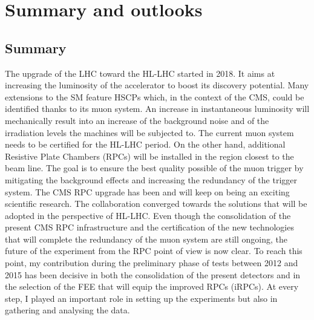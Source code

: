 \renewcommand\evenpagerightmark{{\scshape\small Chapter 7}}
\renewcommand\oddpageleftmark{{\scshape\small Summary and outlooks}}

\hyphenation{}

\chapter[Summary and outlooks]{Summary and outlooks}
\label{chapt7}

	\section{Summary}
	\label{chapt7:sec:summary}
	
	The upgrade of the \acf{LHC} toward the \acf{HL-LHC} started in 2018. It aims at increasing the luminosity of the accelerator to boost its discovery potential. Many extensions to the \acf{SM} feature \acf{HSCPs} which, in the context of the \acf{CMS}, could be identified thanks to its muon system. An increase in instantaneous luminosity will mechanically result into an increase of the background noise and of the irradiation levels the machines will be subjected to. The current muon system needs to be certified for the HL-LHC period. On the other hand, additional Resistive Plate Chambers (RPCs) will be installed in the region closest to the beam line. The goal is to ensure the best quality possible of the muon trigger by mitigating the background effects and increasing the redundancy of the trigger system. The CMS RPC upgrade has been and will keep on being an exciting scientific research. The collaboration converged towards the solutions that will be adopted in the perspective of HL-LHC. Even though the consolidation of the present CMS RPC infrastructure and the certification of the new technologies that will complete the redundancy of the muon system are still ongoing, the future of the experiment from the RPC point of view is now clear. To reach this point, my contribution during the preliminary phase of tests between 2012 and 2015 has been decisive in both the consolidation of the present detectors and in the selection of the \acl{FEE} that will equip the improved RPCs (iRPCs). At every step, I played an important role in setting up the experiments but also in gathering and analysing the data.
	
